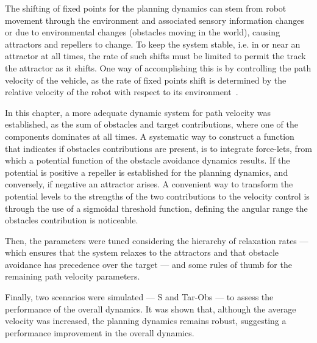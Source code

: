 The shifting of fixed points for the planning dynamics can stem from robot
movement through the environment and associated sensory information 
changes or due to environmental changes (obstacles moving in the world), causing
attractors and repellers to change. To keep
the system stable, i.e. in or near an attractor at all times, the rate of such
shifts must be limited to permit the track the attractor as it shifts. One way
of accomplishing this is by controlling the path velocity of the vehicle, as the
rate of fixed points shift is determined by the relative velocity of the robot
with respect to its environment~\cite{bicho2000dynamic}.

In this chapter, a more adequate dynamic system for path velocity was
established, as the sum of obstacles and target contributions, where one of the
components dominates at all times. A systematic way to construct a
function that indicates if obstacles contributions are present, is to integrate
force-lets, from which a potential function of the obstacle avoidance dynamics
results. If the potential is positive a repeller is established for the planning
dynamics, and conversely, if negative an attractor arises. A convenient way 
to transform the potential levels to the strengths of the two contributions
to the velocity control is through the use of a sigmoidal threshold function,
defining the angular range the obstacles contribution is noticeable.

Then, the parameters were tuned considering the hierarchy of relaxation rates
--- which ensures that the system relaxes to the attractors and that obstacle
avoidance has precedence over the target --- and some rules of thumb for the
remaining path velocity parameters.

Finally, two scenarios were simulated --- S and Tar-Obs --- to assess the
performance of the overall dynamics. It was shown that, although the average
velocity was increased, the planning dynamics remains robust, suggesting a performance improvement in the overall dynamics.
